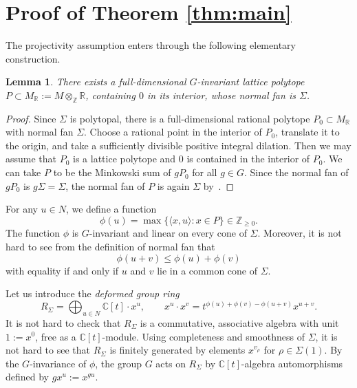 \documentclass[12pt]{amsart}
\newtheorem{lemma}[theorem]{Lemma}
\theoremstyle{remark}
\begin{document}
\section{Proof of Theorem \ref{thm:main}}\label{sec:3}
The projectivity assumption enters through the following elementary
construction.
\begin{lemma}
There exists a full-dimensional $G$-invariant lattice polytope $P\subset M_{\mathbb{R}}:=M\otimes_\mathbb{Z}\mathbb{R}$, containing $0$ in its interior, whose normal fan is $\Sigma$. 
\end{lemma}
\begin{proof}
Since $\Sigma$ is polytopal, there is a full-dimensional rational polytope $P_0\subset M_{\mathbb{R}}$ with normal fan $\Sigma$. 
Choose a rational point in
the interior of $P_0$, translate it to the origin, and take a
sufficiently divisible positive integral dilation. Then we may assume that $P_0$ is a lattice polytope and $0$ is contained in the interior of $P_0$. 
We can take $P$ to be the Minkowski sum of $gP_0$ for all $g\in G$. Since the normal fan of $gP_0$ is
$g\Sigma=\Sigma$, the normal fan of $P$ is again $\Sigma$ by~\cite[Proposition~7.12]{Ziegler}.
\end{proof}

For any $u\in N$, we define a function
$$
\phi(u)=\max\{\langle x,u\rangle:x\in P\}\in \mathbb{Z}_{\geq 0}. $$
The function $\phi$ is $G$-invariant and linear on every cone of $\Sigma$.
Moreover, it is not hard to see from the definition of normal fan that 
\begin{equation*} 
    \phi(u+v)\leq \phi(u)+\phi(v)
\end{equation*}
with equality if and only if $u$ and $v$ lie in a common cone of $\Sigma$. 

Let us introduce the \emph{deformed group ring}
$$R_\Sigma=\bigoplus_{u\in N}\mathbb{C}[t]\cdot x^u,\qquad 
x^u\cdot x^v = t^{\phi(u)+\phi(v)-\phi(u+v)}x^{u+v}. $$
It is not hard to check that $R_\Sigma$ is a commutative, associative algebra with unit $1:=x^0$, free as a $\mathbb{C}[t]$-module.
Using completeness and smoothness of $\Sigma$, it is not hard to see that $R_{\Sigma}$ is finitely generated by elements $x^{v_\rho}$ for $\rho\in \Sigma(1)$. 
By the $G$-invariance of $\phi$, the group $G$ acts on $R_\Sigma$ by $\mathbb{C}[t]$-algebra automorphisms defined by $gx^{u}:=x^{gu}$. 
\end{document}
